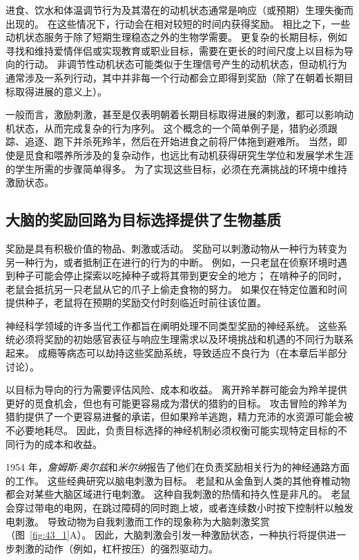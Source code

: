 进食、饮水和体温调节行为及其潜在的动机状态通常是响应（或预期）生理失衡而出现的。
在这些情况下，行动会在相对较短的时间内获得奖励。
相比之下，一些动机状态服务于除了短期生理稳态之外的生物学需要。
更复杂的长期目标，例如寻找和维持爱情伴侣或实现教育或职业目标，需要在更长的时间尺度上以目标为导向的行动。
非调节性动机状态可能类似于生理信号产生的动机状态，但动机行为通常涉及一系列行动，其中并非每一个行动都会立即得到奖励（除了在朝着长期目标取得进展的意义上）。


一般而言，激励刺激，甚至是仅表明朝着长期目标取得进展的刺激，都可以影响动机状态，从而完成复杂的行为序列。
这个概念的一个简单例子是，猎豹必须跟踪、追逐、跑下并杀死羚羊，然后在开始进食之前将尸体拖到避难所。
当然，即使是觅食和喂养所涉及的复杂动作，也远比有动机获得研究生学位和发展学术生涯的学生所需的步骤简单得多。
为了实现这些目标，必须在充满挑战的环境中维持激励状态。



\subsection{大脑的奖励回路为目标选择提供了生物基质}

奖励是具有积极价值的物品、刺激或活动。
奖励可以刺激动物从一种行为转变为另一种行为，或者抵制正在进行的行为的中断。
例如，一只老鼠在侦察环境时遇到种子可能会停止探索以吃掉种子或将其带到更安全的地方；
在啃种子的同时，老鼠会抵抗另一只老鼠从它的爪子上偷走食物的努力。
如果仅在特定位置和时间提供种子，老鼠将在预期的奖励交付时刻临近时前往该位置。


神经科学领域的许多当代工作都旨在阐明处理不同类型奖励的神经系统。
这些系统必须将奖励的初始感官表征与响应生理需求以及环境挑战和机遇的不同行为联系起来。
成瘾等病态可以劫持这些奖励系统，导致适应不良行为（在本章后半部分讨论）。


以目标为导向的行为需要评估风险、成本和收益。
离开羚羊群可能会为羚羊提供更好的觅食机会，但也有可能更容易成为潜伏的猎豹的目标。
攻击冒险的羚羊为猎豹提供了一个更容易进餐的承诺，但如果羚羊逃跑，精力充沛的水资源可能会被不必要地耗尽。
因此，负责目标选择的神经机制必须权衡可能实现特定目标的不同行为的成本和收益。


1954 年，\textit{詹姆斯$\cdot$奥尔兹}和\textit{米尔纳}报告了他们在负责奖励相关行为的神经通路方面的工作。
这些经典研究以脑电刺激为目标。
老鼠和从金鱼到人类的其他脊椎动物都会对某些大脑区域进行电刺激。
这种自我刺激的热情和持久性是非凡的。
老鼠会穿过带电的电网，在跳过障碍的同时跑上坡，或者连续数小时按下控制杆以触发电刺激。
导致动物为自我刺激而工作的现象称为大脑刺激奖赏（图~\ref{fig:43_1}A）。
因此，大脑刺激会引发一种激励状态，一种执行将提供进一步刺激的动作（例如，杠杆按压）的强烈驱动力。


